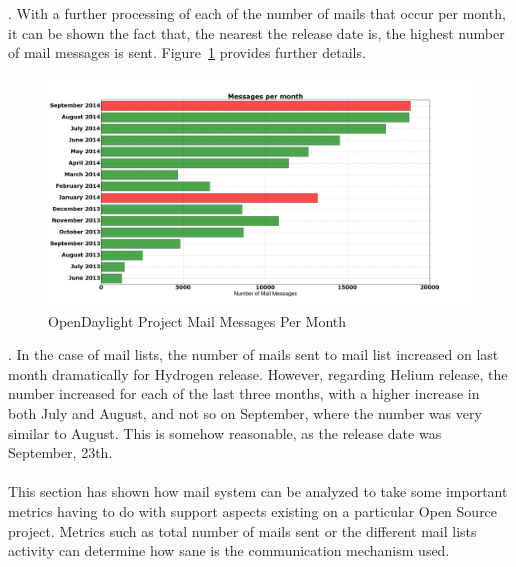 \documentclass[a4paper, 12pt]{book}
\begin{document}
{. With a further processing of each of the number of mails that occur per month, it can be shown the fact that, the nearest the release date is, the highest number of mail messages is sent. Figure~\ref{fig:odl_mails_month} provides further details.
\begin{center}
 \begin{figure}
 \begin{center}
   \includegraphics[width=17cm]{img/messages_month_01.png}
   \caption{OpenDaylight Project Mail Messages Per Month}
   \label{fig:odl_mails_month}
 \end{center}
 \end{figure}
\end{center}
. In the case of mail lists, the number of mails sent to mail list increased on last month dramatically for Hydrogen release. However, regarding Helium release, the number increased for each of the last three months, with a higher increase in both July and August, and not so on September, where the number was very similar to August. This is somehow reasonable, as the release date was September, 23th.\\
\\
This section has shown how mail system can be analyzed to take some important metrics having to do with support aspects existing on a particular Open Source project. Metrics such as total number of mails sent or the different mail lists activity can determine how sane is the communication mechanism used.

}
\end{document}
